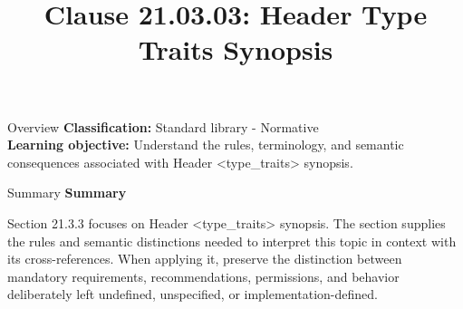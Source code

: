 \documentclass[10pt,letterpaper]{article}
\title{Clause 21.03.03: Header Type Traits Synopsis}
\author{}
\date{}
\begin{document}
\maketitle
\begin{CornellOverviewBox}{Overview}
\textbf{Classification:} Standard library - Normative\\[2pt]
\textbf{Learning objective:} Understand the rules, terminology, and semantic consequences associated with Header <type\_traits> synopsis.
\end{CornellOverviewBox}\begin{CornellSummaryBox}{Summary}
{\sffamily\bfseries\color{Accent} Summary}\par\vspace{3pt}Section 21.3.3 focuses on Header <type\_traits> synopsis. The section supplies the rules and semantic distinctions needed to interpret this topic in context with its cross-references. When applying it, preserve the distinction between mandatory requirements, recommendations, permissions, and behavior deliberately left undefined, unspecified, or implementation-defined.
\end{CornellSummaryBox}
\end{document}

